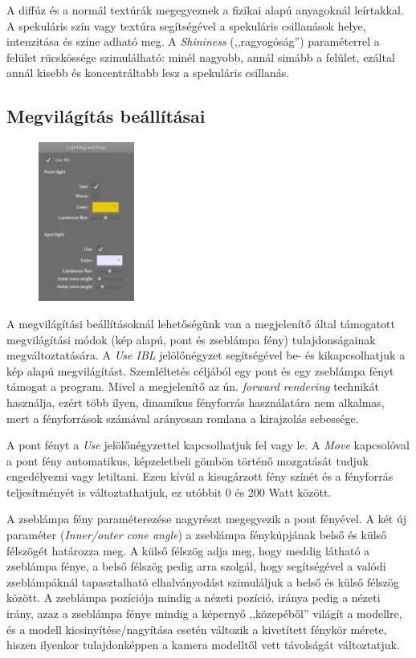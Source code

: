 A diffúz és a normál textúrák megegyeznek a fizikai alapú anyagoknál leírtakkal. A spekuláris szín vagy textúra segítségével a spekuláris csillanások helye, intenzitása és színe adható meg. A \textit{Shininess} (,,ragyogóság'') paraméterrel a felület rücskössége szimulálható: minél nagyobb, annál simább a felület, ezáltal annál kisebb és koncentráltabb lesz a spekuláris csillanás.

\clearpage

\subsection{Megvilágítás beállításai}

\begin{figure}
    \vspace{-23pt}
    \includegraphics[width=0.28\textwidth]{images/lighting_settings.png}
    \vspace{-20pt}
\end{figure}

A megvilágítási beállításoknál lehetőségünk van a megjelenítő által támogatott megvilágítási módok (kép alapú, pont és zseblámpa fény) tulajdonságainak megváltoztatására. A \textit{Use IBL} jelölőnégyzet segítségével be- és kikapcsolhatjuk a kép alapú megvilágítást. Szemléltetés céljából egy pont és egy zseblámpa fényt támogat a program. Mivel a megjelenítő az ún. \textit{forward rendering} technikát használja, ezért több ilyen, dinamikus fényforrás használatára nem alkalmas, mert a fényforrások számával arányosan romlana a kirajzolás sebessége.

A pont fényt a \textit{Use} jelölőnégyzettel kapcsolhatjuk fel vagy le. A \textit{Move} kapcsolóval a pont fény automatikus, képzeletbeli gömbön történő mozgatását tudjuk engedélyezni vagy letiltani. Ezen kívül a kisugárzott fény színét és a fényforrás teljesítményét is változtathatjuk, ez utóbbit 0 és 200 Watt között.

A zseblámpa fény paraméterezése nagyrészt megegyezik a pont fényével. A két új paraméter (\textit{Inner/outer cone angle}) a zseblámpa fénykúpjának belső és külső félszögét határozza meg. A külső félszög adja meg, hogy meddig látható a zseblámpa fénye, a belső félszög pedig arra szolgál, hogy segítségével a valódi zseblámpáknál tapasztalható elhalványodást szimuláljuk a belső és külső félszög között. A zseblámpa pozíciója mindig a nézeti pozíció, iránya pedig a nézeti irány, azaz a zseblámpa fénye mindig a képernyő ,,közepéből'' világít a modellre, és a modell kicsinyítése/nagyítása esetén változik a kivetített fénykör mérete, hiszen ilyenkor tulajdonképpen a kamera modelltől vett távolságát változtatjuk.
